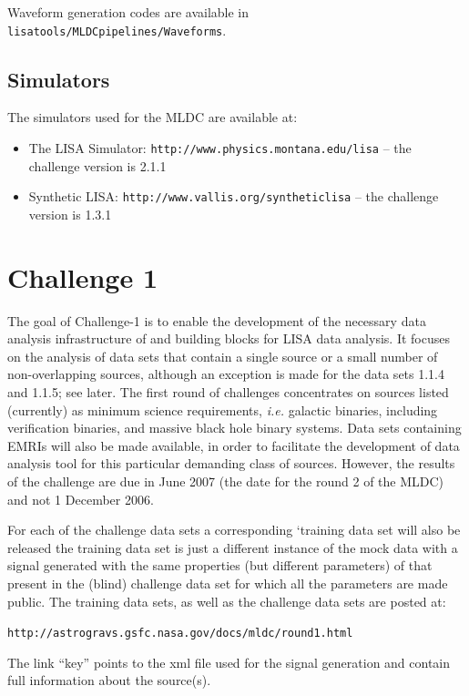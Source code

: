 \documentclass[11pt]{report}
\begin{document}
Waveform generation codes are available in {\tt lisatools/MLDCpipelines/Waveforms}.

\section{Simulators}

The simulators used for the MLDC are available at:

\begin{itemize}
\item The LISA Simulator: {\tt http://www.physics.montana.edu/lisa} -- the challenge version is 2.1.1
\item Synthetic LISA: {\tt http://www.vallis.org/syntheticlisa} -- the challenge version is 1.3.1
\end{itemize}


\chapter{Challenge 1}

The goal of Challenge-1 is to enable the development of the necessary data analysis infrastructure of and building blocks for LISA data analysis. It focuses on the analysis of data sets that contain a single source or a small number of non-overlapping sources, although an exception is made for the data sets 1.1.4 and 1.1.5; see later. The first round of challenges concentrates on sources listed (currently) as minimum science requirements, {\em i.e.} galactic binaries, including verification binaries, and massive black hole binary systems. Data sets containing EMRIs will also be made available, in order to facilitate the development of data analysis tool for this particular demanding class of sources. However, the results of the challenge are due in June 2007 (the date for the round 2 of the MLDC) and not 1 December 2006.

For each of the challenge data sets a corresponding `training data set will also be released the training data set is just a different instance of the mock data with a signal generated with the same properties (but different parameters) of that present in the (blind) challenge data set for which all the parameters are made public. The training data sets, as well as the challenge data sets are posted at:

{\tt http://astrogravs.gsfc.nasa.gov/docs/mldc/round1.html}

The link ``key'' points to the xml file used for the signal generation and contain full information about the source(s).
\end{document}

